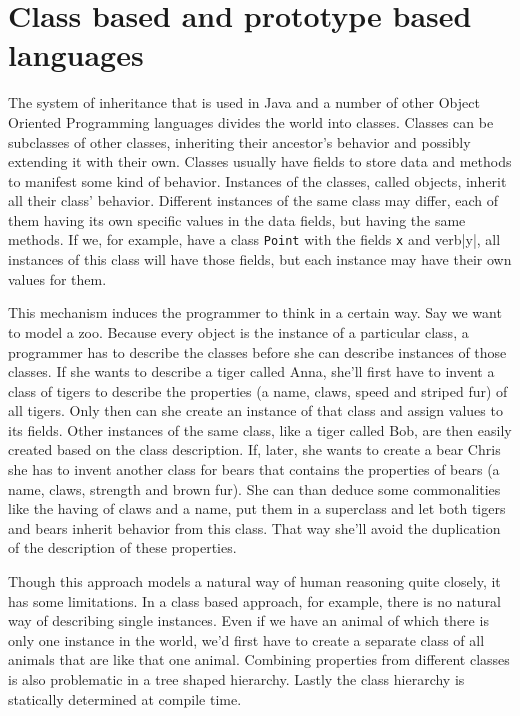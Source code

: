 \documentclass[a4paper,12pt]{book}
\begin{document}
\section*{Class based and prototype based languages}
The system of inheritance that is used in Java and a number of other Object Oriented Programming languages divides the world into classes. Classes can be subclasses of other classes, inheriting their ancestor's behavior and possibly extending it with their own. Classes usually have fields to store data and methods to manifest some kind of behavior. Instances of the classes, called objects, inherit all their class' behavior.  Different instances of the same class may differ, each of them having its own specific values in the data fields, but having the same methods. If we, for example, have a class \verb|Point| with the fields \verb|x| and verb|y|, all instances of this class will have those fields, but each instance may have their own values for them.

This mechanism induces the programmer to think in a certain way. Say we want to model a zoo. Because every object is the instance of a particular class, a programmer has to describe the classes before she can describe instances of those classes. If she wants to describe a tiger called Anna, she'll first have to invent a class of tigers to describe the properties (a name, claws, speed and striped fur) of all tigers. Only then can she create an instance of that class and assign values to its fields. Other instances of the same class, like a tiger called Bob, are then easily created based on the class description. If, later, she wants to create a bear Chris she has to invent another class for bears that contains the properties of bears (a name, claws, strength and brown fur). She can than deduce some commonalities like the having of claws and a name, put them in a superclass and let both tigers and bears inherit behavior from this class. That way she'll avoid the duplication of the description of these properties.

Though this approach models a natural way of human reasoning quite closely, it has some limitations. In a class based approach, for example, there is no natural way of describing single instances. Even if we have an animal of which there is only one instance in the world, we'd first have to create a separate class of all animals that are like that one animal. Combining properties from different classes is also problematic in a tree shaped hierarchy. Lastly the class hierarchy is statically determined at compile time.
\end{document}
